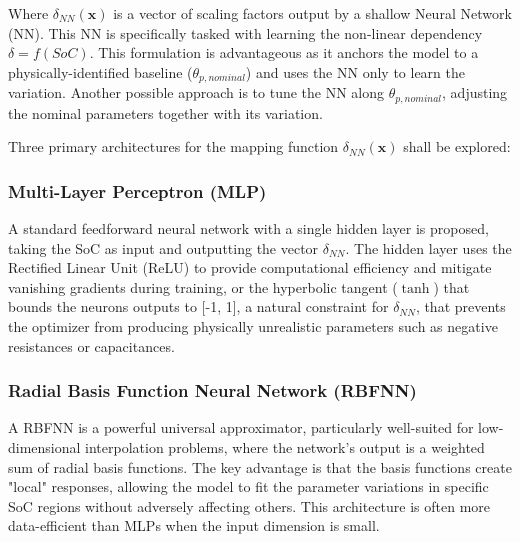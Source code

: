 \documentclass[lettersize,journal]{IEEEtran}
\begin{document}
Where $\delta_{NN}(\mathbf{x})$ is a vector of scaling factors output by a shallow Neural Network (NN). This NN is specifically tasked with learning the non-linear dependency $\delta = f(SoC)$. This formulation is advantageous as it anchors the model to a physically-identified baseline ($\theta_{p, nominal}$) and uses the NN only to learn the variation. Another possible approach is to tune the NN along $\theta_{p, nominal}$, adjusting the nominal parameters together with its variation.

Three primary architectures for the mapping function $\delta_{NN}(\mathbf{x})$ shall be explored:

\subsubsection{Multi-Layer Perceptron (MLP)}

A standard feedforward neural network with a single hidden layer is proposed, taking the SoC as input and outputting the vector $\delta_{NN}$. The hidden layer uses the Rectified Linear Unit (ReLU) to provide computational efficiency and mitigate vanishing gradients during training, or the hyperbolic tangent ($\tanh$) that bounds the neurons outputs to [-1, 1], a natural constraint for $\delta_{NN}$, that prevents the optimizer from producing physically unrealistic parameters such as negative resistances or capacitances.

\subsubsection{Radial Basis Function Neural Network (RBFNN)}

A RBFNN is a powerful universal approximator, particularly well-suited for low-dimensional interpolation problems\cite{broomhead1988radial}, where the network's output is a weighted sum of radial basis functions. The key advantage is that the basis functions create "local" responses, allowing the model to fit the parameter variations in specific SoC regions without adversely affecting others. This architecture is often more data-efficient than MLPs when the input dimension is small\cite{broomhead1988radial}.
\end{document}
